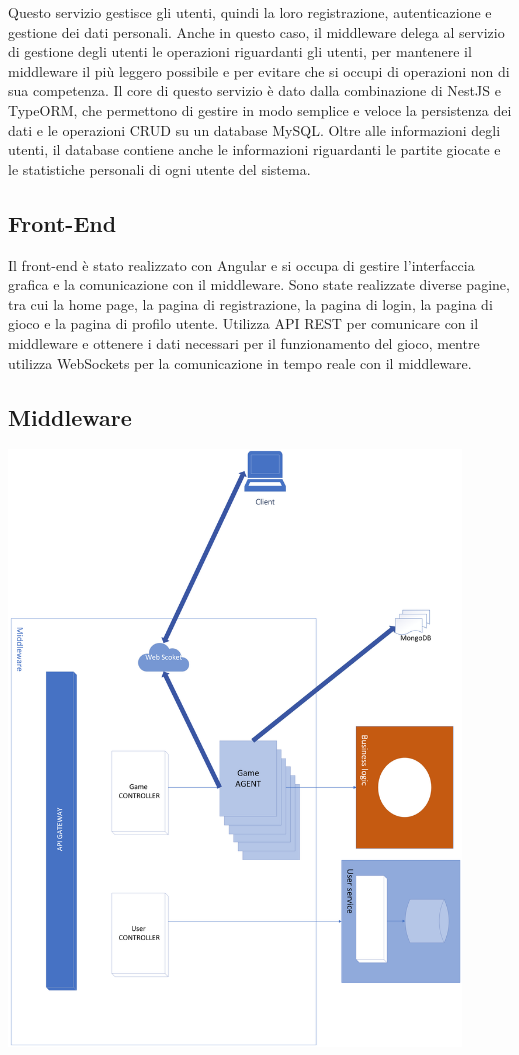 Questo servizio gestisce gli utenti, quindi la loro registrazione, autenticazione e gestione dei dati personali.
Anche in questo caso, il middleware delega al servizio di gestione degli utenti le operazioni riguardanti gli utenti, per mantenere il middleware il più leggero possibile e per evitare che si occupi di operazioni non di sua competenza.
Il core di questo servizio è dato dalla combinazione di NestJS e TypeORM, che permettono di gestire in modo semplice e veloce la persistenza dei dati e le operazioni CRUD su un database MySQL.
Oltre alle informazioni degli utenti, il database contiene anche le informazioni riguardanti le partite giocate e le statistiche personali di ogni utente del sistema.

\subsection{Front-End}

Il front-end è stato realizzato con Angular e si occupa di gestire l'interfaccia grafica e la comunicazione con il middleware.
Sono state realizzate diverse pagine, tra cui la home page, la pagina di registrazione, la pagina di login, la pagina di gioco e la pagina di profilo utente.
Utilizza API REST per comunicare con il middleware e ottenere i dati necessari per il funzionamento del gioco, mentre utilizza WebSockets per la comunicazione in tempo reale con il middleware. 


\subsection{Middleware}


\includegraphics[width=12cm]{report/img/middleware.png}\\[10.5cm]

